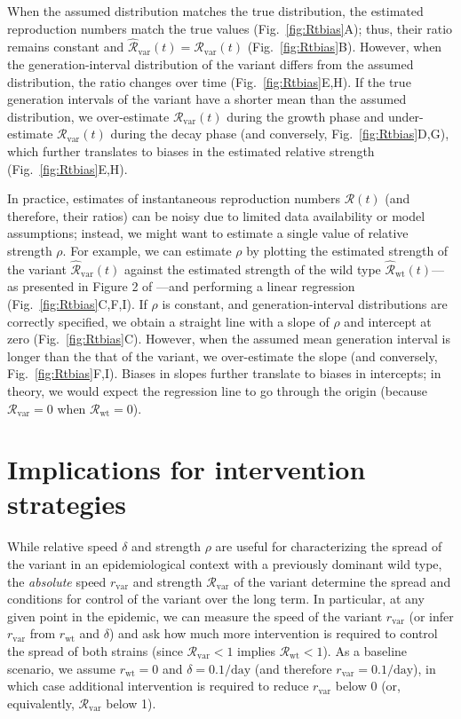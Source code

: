 \documentclass[12pt]{article}
\newcommand{\fref}[1]{Fig.~\ref{fig:#1}}
\newcommand{\vvvar}{\mathrm{var}}
\newcommand{\wwwt}{\mathrm{wt}}
\newcommand{\rx}[1]{\ensuremath{{r}_{#1}}\xspace}
\newcommand{\rw}{\rx{\wwwt}}
\newcommand{\rv}{\rx{\vvvar}}
\newcommand{\Rx}[1]{\ensuremath{{\mathcal R}_{#1}}\xspace}
\newcommand{\RR}{\ensuremath{{\mathcal R}}\xspace}
\newcommand{\Rw}{\Rx{\wwwt}}
\newcommand{\Rv}{\Rx{\vvvar}}
\newcommand{\pday}{\ensuremath{/\textrm{day}}}
\begin{document}
When the assumed distribution matches the true distribution, the estimated reproduction numbers match the true values (\fref{Rtbias}A); thus, their ratio remains constant and $\hat{\RR}_{\textrm{var}}(t)=\Rv(t)$ (\fref{Rtbias}B).
However, when the generation-interval distribution of the variant differs from the assumed distribution, the ratio changes over time (\fref{Rtbias}E,H).
If the true generation intervals of the variant have a shorter mean than the assumed distribution, we over-estimate $\Rv(t)$ during the growth phase and under-estimate $\Rv(t)$ during the decay phase (and conversely, \fref{Rtbias}D,G), which further translates to biases in the estimated relative strength (\fref{Rtbias}E,H).

In practice, estimates of instantaneous reproduction numbers $\RR(t)$ (and therefore, their ratios) can be noisy due to limited data availability or model assumptions;
instead, we might want to estimate a single value of relative strength $\rho$.
For example, we can estimate $\rho$ by plotting the estimated strength of the variant $\hat{\RR}_{\textrm{var}}(t)$ against the estimated strength of the wild type $\hat{\RR}_{\textrm{wt}}(t)$---as presented in Figure 2 of \cite{volz2021transmission}---and performing a linear regression (\fref{Rtbias}C,F,I).
If $\rho$ is constant, and generation-interval distributions are correctly specified, we obtain a straight line with a slope of $\rho$ and intercept at zero (\fref{Rtbias}C).
However, when the assumed mean generation interval is longer than the that of the variant, we over-estimate the slope (and conversely, \fref{Rtbias}F,I).
Biases in slopes further translate to biases in intercepts; in theory, we would expect the regression line to go through the origin (because $\Rv = 0$ when $\Rw = 0$).

\section{Implications for intervention strategies}

While relative speed $\delta$ and strength $\rho$ are useful for characterizing the spread of the variant in an epidemiological context with a previously dominant wild type, the \emph{absolute} speed $\rv$ and strength $\Rv$ of the variant determine the spread and conditions for control of the variant over the long term.
In particular, at any given point in the epidemic, we can measure the speed of the variant $\rv$ (or infer $\rv$ from $\rw$ and $\delta$) and ask how much more intervention is required to control the spread of both strains (since $\Rv < 1$ implies $\Rw < 1$).
As a baseline scenario, we assume $\rw=0$ and $\delta=0.1\pday$ (and therefore $\rv=0.1\pday$), in which case additional intervention is required to reduce $\rv$ below 0 (or, equivalently, $\Rv$ below 1).
\end{document}
